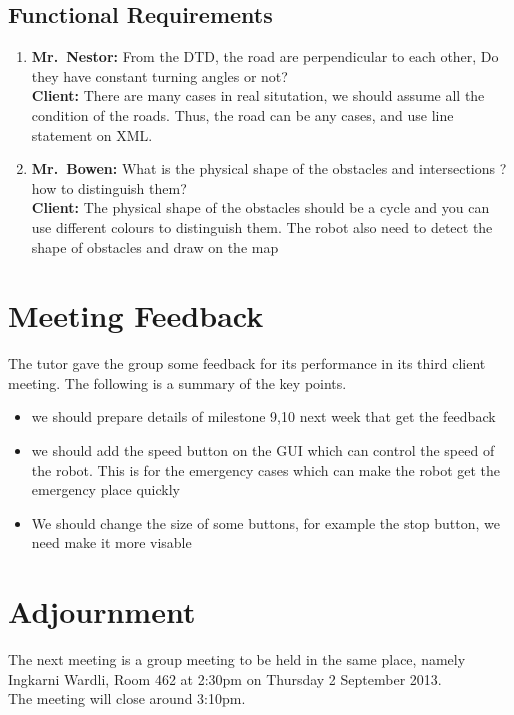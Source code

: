 \documentclass[12pt, a4paper]{article}
\begin{document}
\subsection{Functional Requirements}
\begin{enumerate}
 \item \textbf{Mr.~Nestor:}      From the DTD, the road are perpendicular to each other, Do they have constant turning angles or not?  \\
       \textbf{Client:}     There are many cases in real situtation, we should assume all the condition of the roads. Thus, the road can be any cases, and use line statement on XML. 
 

 \item \textbf{Mr.~Bowen:}     What is the  physical shape of the obstacles and intersections ? how to distinguish them? \\
       \textbf{Client:}     The physical shape of the obstacles should be a cycle and you can use different colours to distinguish them. The robot also need to detect the shape of  obstacles and draw on the map


\end{enumerate}
\section{Meeting Feedback}
The tutor gave the group some feedback for its performance in its third client meeting. The following is a
summary of the key points.
\begin{itemize}
 \item we should prepare details of milestone 9,10 next week that get the feedback
\end{itemize}
\begin{itemize}
 \item we should add the speed button on the GUI which can control the speed of the robot. This is for the emergency cases which can make the robot get the emergency place quickly
\end{itemize}

\begin{itemize}
 \item We should change the size of some buttons, for example the stop button, we need make it more visable 
\end{itemize}

\section{Adjournment}
The next meeting is a group meeting to be held in the same place, namely Ingkarni
Wardli, Room 462 at 2:30pm on Thursday 2 September 2013.\\
The meeting will close around 3:10pm.
\end{document}
